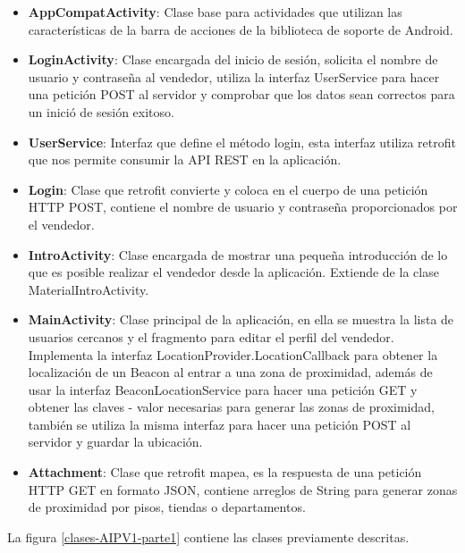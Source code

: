 \begin{itemize}
\item \textbf{AppCompatActivity}: Clase base para actividades que utilizan las características de la barra de acciones de la biblioteca de soporte de Android.
\item \textbf{LoginActivity}: Clase encargada del inicio de sesión, solicita el nombre de usuario y contraseña al vendedor, utiliza la interfaz UserService para hacer una petición POST al servidor y comprobar que los datos sean correctos para un inició de sesión exitoso.
\item \textbf{UserService}: Interfaz que define el método login, esta interfaz utiliza retrofit que nos permite consumir la API REST en la aplicación.
\item \textbf{Login}: Clase que retrofit convierte y coloca en el cuerpo de una petición HTTP POST, contiene el nombre de usuario y contraseña proporcionados por el vendedor.
\item \textbf{IntroActivity}: Clase encargada de mostrar una pequeña introducción de lo que es posible realizar el vendedor desde la aplicación. Extiende de la clase MaterialIntroActivity.
\item \textbf{MainActivity}: Clase principal de la aplicación, en ella se muestra la lista de usuarios cercanos y el fragmento para editar el perfil del vendedor. Implementa la interfaz LocationProvider.LocationCallback para obtener la localización de un Beacon al entrar a una zona de proximidad, además de usar la interfaz BeaconLocationService para hacer una petición GET y obtener las claves - valor necesarias para generar las zonas de proximidad, también se utiliza la misma interfaz para hacer una petición POST al servidor y guardar la ubicación.
\item \textbf{Attachment}: Clase que retrofit mapea, es la respuesta de una petición HTTP GET en formato JSON, contiene arreglos de String para generar zonas de proximidad por pisos, tiendas o departamentos.
\end{itemize}

La figura \ref{clases-AIPV1-parte1} contiene las clases previamente descritas.


